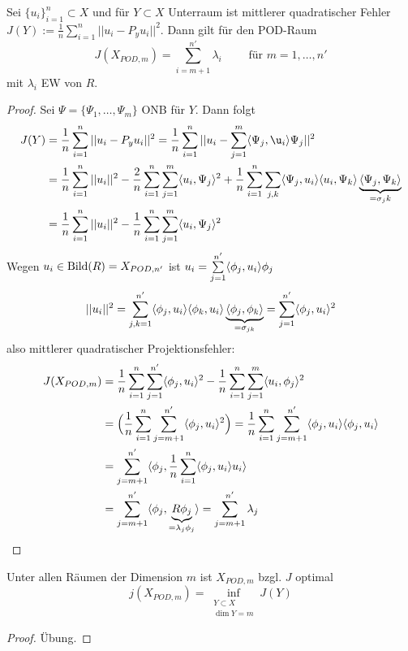 \begin{satz}
Sei $\{u_i\}_{i=1}^n \subset X$ und für $Y \subset X$ Unterraum ist mittlerer quadratischer Fehler $J(Y) := \frac{1}{n} \sum\limits_{i=1}^n || u_i - P_y u_i||^2$. Dann gilt für den POD-Raum
\[
	J(X_{POD,m}) = \sum\limits_{i=m+1}^{n'} \lambda_i \qquad \text{ für } m=1,\dots,n'
\]
mit $\lambda_i$ EW von $R$.
\begin{proof}
	Sei $\Psi = \{\Psi_1,\dots,\Psi_m\}$ ONB für $Y$. Dann folgt
	\begin{align*}
		J(Y) &= \frac{1}{n} \sum\limits_{i=1}^n ||u_i - P_y u_i||^2 = \frac{1}{n} \sum\limits_{i=1}^n || u_i - \sum\limits_{j=1}^m \dotp{\Psi_j}{\u_i} \Psi_j ||^2 \\
		&= \frac{1}{n} \sum\limits_{i=1}^n ||u_i||^2 - \frac{2}{n} \sum\limits_{i=1}^n \sum\limits_{j=1}^m \dotp{u_i}{\Psi_j}^2 + \frac{1}{n} \sum\limits_{i=1}^n \sum\limits_{j,k} \dotp{\Psi_j}{u_i} \dotp{u_i}{\Psi_k} \underbrace{\dotp{\Psi_j}{\Psi_k}}_{= \sigma_jk} \\
		&= \frac{1}{n} \sum\limits_{i=1}^n ||u_i||^2 - \frac{1}{n} \sum\limits_{i=1}^n \sum\limits_{j=1}^m \dotp{u_i}{\Psi_j}^2
	\end{align*}
	Wegen $u_i \in \operatorname{Bild} (R) = X_{POD,n'}$ ist $u_i = \sum\limits_{j=1}^{n'} \dotp{\phi_j}{u_i} \phi_j$
	\[ 
		||u_i||^2 = \sum\limits_{j,k=1}^{n'} \dotp{\phi_j}{u_i} \dotp{\phi_k}{u_i} \underbrace{\dotp{\phi_j}{\phi_k}}_{= \sigma_{jk}} = \sum\limits_{j=1}^{n'} \dotp{\phi_j}{u_i}^2
	\]
	also mittlerer quadratischer Projektionsfehler:
	\begin{align*}
		J(X_{POD,m}) &= \frac{1}{n} \sum\limits_{i=1}^n \sum\limits_{j=1}^{n'} \dotp{\phi_j}{u_i}^2 - \frac{1}{n} \sum\limits_{i=1}^n \sum\limits_{j=1}^m \dotp{u_i}{\phi_j}^2 \\
		&= \Big(  \frac{1}{n} \sum\limits_{i=1}^n \sum\limits_{j=m+1}^{n'} \dotp{\phi_j}{u_i}^2  \Big) = \frac{1}{n} \sum\limits_{i=1}^n \sum\limits_{j=m+1}^{n'} \dotp{\phi_j}{u_i} \dotp{\phi_j}{u_i} \\
		&= \sum\limits_{j=m+1}^{n'} \dotp{\phi_j}{\frac{1}{n} \sum\limits_{i=1}^n \dotp{\phi_j}{u_i} u_i} \\
		&= \sum\limits_{j=m+1}^{n'} \dotp{\phi_j}{\underbrace{R \phi_j}_{= \lambda_j \phi_j}} = \sum\limits_{j=m+1}^{n'} \lambda_j
	\end{align*}
\end{proof}
\end{satz}

\begin{satz}
	Unter allen Räumen der Dimension $m$ ist $X_{POD,m}$ bzgl. $J$ optimal
	\[
		j(X_{POD,m}) = \inf\limits_{\substack{Y \subset X \\ \dim Y = m}} J(Y)
	\]
	\begin{proof}
		Übung.
	\end{proof}
\end{satz}

